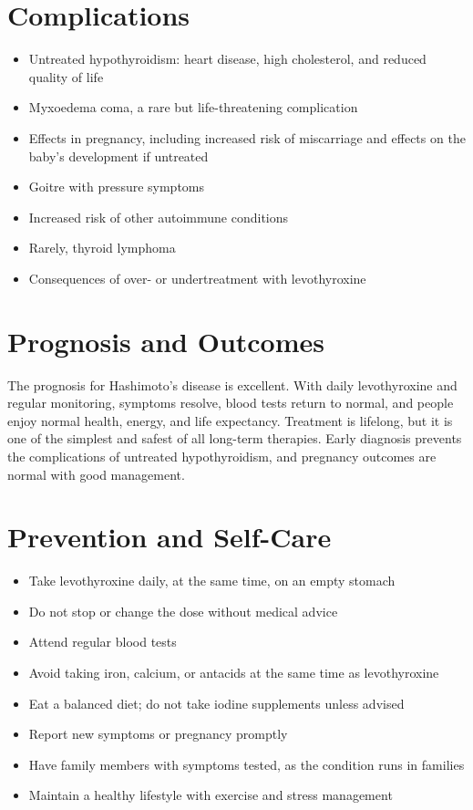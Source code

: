 \section*{Complications}
\begin{itemize}
    \item Untreated hypothyroidism: heart disease, high cholesterol, and reduced quality of life
    \item Myxoedema coma, a rare but life-threatening complication
    \item Effects in pregnancy, including increased risk of miscarriage and effects on the baby's development if untreated
    \item Goitre with pressure symptoms
    \item Increased risk of other autoimmune conditions
    \item Rarely, thyroid lymphoma
    \item Consequences of over- or undertreatment with levothyroxine
\end{itemize}

\section*{Prognosis and Outcomes}
The prognosis for Hashimoto's disease is excellent. With daily levothyroxine and regular monitoring, symptoms resolve, blood tests return to normal, and people enjoy normal health, energy, and life expectancy. Treatment is lifelong, but it is one of the simplest and safest of all long-term therapies. Early diagnosis prevents the complications of untreated hypothyroidism, and pregnancy outcomes are normal with good management.

\section*{Prevention and Self-Care}
\begin{itemize}
    \item Take levothyroxine daily, at the same time, on an empty stomach
    \item Do not stop or change the dose without medical advice
    \item Attend regular blood tests
    \item Avoid taking iron, calcium, or antacids at the same time as levothyroxine
    \item Eat a balanced diet; do not take iodine supplements unless advised
    \item Report new symptoms or pregnancy promptly
    \item Have family members with symptoms tested, as the condition runs in families
    \item Maintain a healthy lifestyle with exercise and stress management
\end{itemize}

